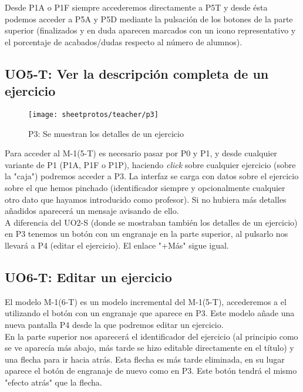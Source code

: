 Desde P1A o P1F siempre accederemos directamente a P5T y desde ésta podemos acceder a P5A y P5D mediante la pulsación de los botones de la parte superior (finalizados y en duda aparecen marcados con un icono representativo y el porcentaje de acabados/dudas respecto al número de alumnos).\\

\subsection{UO5-T: Ver la descripción completa de un ejercicio}
\label{analisis-de-requisitos:funcionales:uo5t}

\begin{figure}[H]
	\centering
	\texttt{[image: sheetprotos/teacher/p3]}
	\caption{P3: Se muestran los detalles de un ejercicio}
	\label{fig:p3}
\end{figure}

Para acceder al M-1(5-T) es necesario pasar por P0 y P1, y desde cualquier variante de P1 (P1A, P1F o P1P), haciendo \textit{click} sobre cualquier ejercicio (sobre la "caja") podremos acceder a P3. La interfaz se carga con datos sobre el ejercicio sobre el que hemos pinchado (identificador siempre y opcionalmente cualquier otro dato que hayamos introducido como profesor). Si no hubiera más detalles añadidos aparecerá un mensaje avisando de ello.\\

A diferencia del UO2-S (donde se mostraban también los detalles de un ejercicio) en P3 tenemos un botón con un engranaje en la parte superior, al pulsarlo nos llevará a P4 (editar el ejercicio). El enlace "+Más" sigue igual.\\

\subsection{UO6-T: Editar un ejercicio}
\label{analisis-de-requisitos:funcionales:uo6t}

El modelo M-1(6-T) es un modelo incremental del M-1(5-T), accederemos a el utilizando el botón con un engranaje que aparece en P3. Este modelo añade una nueva pantalla P4 desde la que podremos editar un ejercicio.\\

En la parte superior nos aparecerá el identificador del ejercicio (al principio como se ve aparecía más abajo, más tarde se hizo editable directamente en el título) y una flecha para ir hacia atrás. Esta flecha es más tarde eliminada, en su lugar aparece el botón de engranaje de nuevo como en P3. Este botón tendrá el mismo "efecto atrás" que la flecha.\\

